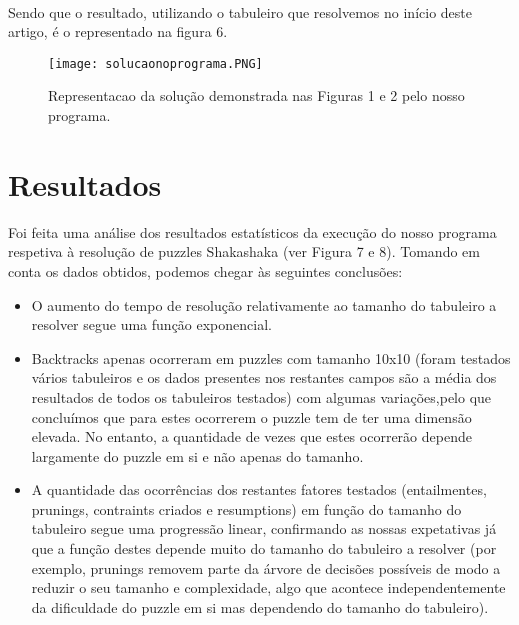 \documentclass[runningheads]{llncs}
\begin{document}
\paragraph{}
\vspace*{-\parskip}


Sendo que o resultado, utilizando o tabuleiro que resolvemos no início deste artigo, é o representado na figura 6.

\begin{figure}
\begin{center}
\texttt{[image: solucaonoprograma.PNG]}
\caption{Representacao da solução demonstrada nas Figuras 1 e 2 pelo nosso programa.} 
\label{solucaonoprograma.PNG}
\end{center}
\end{figure}
\paragraph{}
\vspace*{-\parskip}



\section{Resultados}
Foi feita uma análise dos resultados estatísticos da execução do nosso programa respetiva à resolução de puzzles Shakashaka (ver Figura 7 e 8). Tomando em conta os dados obtidos, podemos chegar às seguintes conclusões:

\begin{itemize}
  \item O aumento do tempo de resolução relativamente ao tamanho do tabuleiro a resolver segue uma função exponencial.
  \item Backtracks apenas ocorreram em puzzles com tamanho 10x10 (foram testados vários tabuleiros e os dados presentes nos restantes campos são a média dos resultados de todos os tabuleiros testados) com algumas variações,pelo que concluímos que para estes ocorrerem o puzzle tem de ter uma dimensão elevada. No entanto, a quantidade de vezes que estes ocorrerão depende largamente do puzzle em si e não apenas do tamanho.
  \item A quantidade das ocorrências dos restantes fatores testados (entailmentes, prunings, contraints criados e resumptions) em função do tamanho do tabuleiro segue uma progressão linear, confirmando as nossas expetativas já que a função destes depende muito do tamanho do tabuleiro a resolver (por exemplo, prunings removem parte da árvore de decisões possíveis de modo a reduzir o seu tamanho e complexidade, algo que acontece independentemente da dificuldade do puzzle em si mas dependendo do tamanho do tabuleiro).
\end{itemize}
\end{document}
